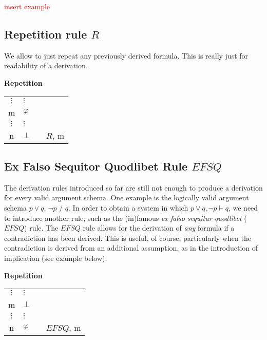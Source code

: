 \documentclass[nobib,nofonts]{tufte-handout}
\newcommand{\EFSQ}{\ensuremath{\mathit{EFSQ}}\xspace}
\begin{document}
\textcolor{red}{insert example}

\subsection{Repetition rule $R$}

We allow to just repeat any previously derived formula.
This is really just for readability of a derivation.

\bigskip
\noindent \colorbox{mygray!60}{\centering
  \begin{minipage}[t]{0.35\linewidth}
    \textbf{Repetition}
  \end{minipage}
  \begin{minipage}[t]{0.55\linewidth}
    \begin{tabular}{clcl}
            $\vdots$ & $\vdots$  & \\
      m              & $\varphi$ &  \\
            $\vdots$ & $\vdots$  & \\
      n              & $\bot$    & & $R$, m
    \end{tabular}
  \end{minipage}
}
\bigskip

\subsection{Ex Falso Sequitor Quodlibet Rule $\EFSQ$}

The derivation rules introduced so far are still not enough to produce a derivation for every valid argument schema.
One example is the logically valid argument schema $p \vee q$, $\neg p$ / $q$.
In order to obtain a system in which $p \vee q, \neg p \vdash q$, we need to introduce another rule, such as the (in)famous \emph{ex falso sequitur quodlibet} (\EFSQ) rule.
The \EFSQ rule allows for the derivation of \emph{any} formula if a contradiction has been derived.
This is useful, of course, particularly when the contradiction is derived from an additional assumption, as in the introduction of implication (see example below).

\bigskip
\noindent \colorbox{mygray!60}{\centering
  \begin{minipage}[t]{0.35\linewidth}
    \textbf{Repetition}
  \end{minipage}
  \begin{minipage}[t]{0.55\linewidth}
    \begin{tabular}{clcl}
            $\vdots$ & $\vdots$  & \\
      m              & $\bot$ &  \\
            $\vdots$ & $\vdots$  & \\
      n              & $\varphi$    & & $\EFSQ$, m
    \end{tabular}
  \end{minipage}
}
\bigskip
\end{document}
